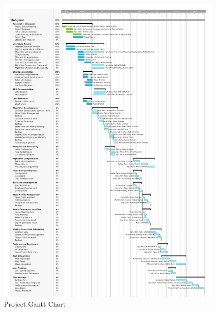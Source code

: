 \begin{center}
        \begin{figure}[H]
        \centering
        \includegraphics[width=\textwidth]{images/Rahguzar (2)-1.png} 
        \caption{Project Gantt Chart}
    \end{figure}
\end{center}



